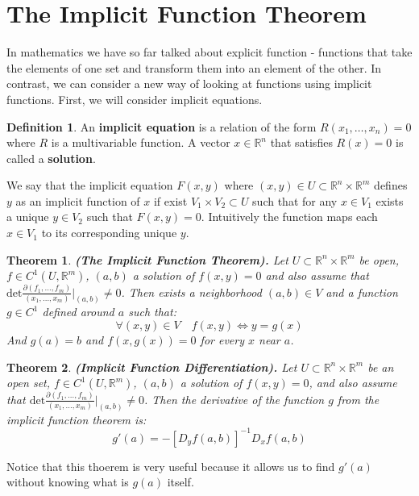 \documentclass[11pt,a4paper]{article}
\theoremstyle{definition}
\newtheorem{definition}{Definition}[section]
\theoremstyle{plain}
\newtheorem{theorem}{Theorem}[section]
\newcommand{\R}{\mathbb{R}}
\begin{document}
	\newpage
	
	
	\section{The Implicit Function Theorem}
	In mathematics we have so far talked about explicit function - functions
	that take the elements of one set and transform them into an element
	of the other. In contrast, we can consider a new way of looking at
	functions using implicit functions. First, we will consider 
	implicit equations.
	\begin{definition}
		An \textbf{implicit equation} is a relation of the form 
		$R(x_1,\dots,x_n) = 0$ where $R$ is a multivariable function.
		A vector $x \in \R^n$ that satisfies $R(x) = 0$ is called a
		\textbf{solution}.
	\end{definition}
	We say that the implicit equation $F(x,y)$ where 
	$(x,y) \in U \subset \R^n \times \R^m$ defines $y$ as an implicit 
	function of $x$ if exist $V_1 \times V_2 \subset U$ such that 
	for any $x \in V_1$ exists a unique $y \in V_2$ such that $F(x,y) = 0$.
	Intuitively the function maps each $x \in V_1$ to its corresponding
	unique $y$.
	\begin{theorem}
		\textnormal{\textbf{(The Implicit Function Theorem).}} 
		Let $U \subset \R^n \times \R^m$ be open, $f \in C^1(U,\R^m)$, $(a,b)$ 
		a solution of $f(x,y) = 0$ and also assume that $\mathrm{det}
		\frac{\partial(f_1,\dots,f_m)}{(x_1,\dots,x_m)}\vert_{(a,b)} \neq 0$.
		Then exists a neighborhood $(a,b) \in V$ and a function $g \in C^1$ 
		defined around $a$ such that:
		\[
			\forall (x,y) \in V \quad f(x,y) \iff y = g(x)
		\]
		And $g(a) = b$ and $f(x,g(x)) = 0$ for every $x$ near $a$.
	\end{theorem}
	\begin{theorem}
		\textnormal{\textbf{(Implicit Function Differentiation).}}
		Let $U \subset \R^n \times \R^m$ be an open set, $f \in C^1(U,\R^m)$, 
		$(a,b)$ a solution of $f(x,y) = 0$, and also assume that $\mathrm{det}
		\frac{\partial(f_1,\dots,f_m)}{(x_1,\dots,x_m)}\vert_{(a,b)} \neq 0$.
		Then the derivative of the function $g$ from the implicit function
		theorem is:
		\[
			g'(a) = -[D_y f(a,b)]^{-1} D_x f(a,b)
		\]
	\end{theorem}
	Notice that this thoerem is very useful because it allows us to find
	$g'(a)$ without knowing what is $g(a)$ itself.
	
	\newpage
	
\end{document}
